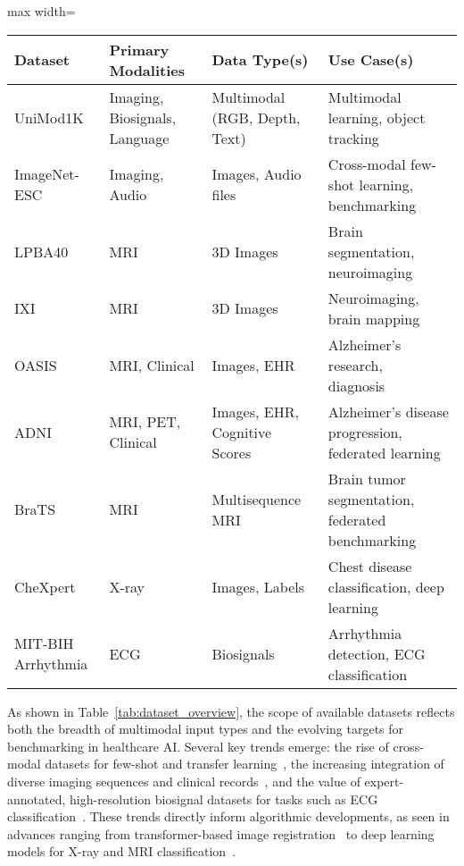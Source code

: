 \documentclass[sigconf]{acmart}
\begin{document}
\begin{table*}[htbp]
\centering
\caption{Summary of Representative Multimodal Healthcare Datasets and Supported Modalities}
\label{tab:dataset_overview}
\begin{adjustbox}{max width=\textwidth}
\begin{tabular}{@{}llll@{}}
\toprule
\textbf{Dataset} & \textbf{Primary Modalities} & \textbf{Data Type(s)} & \textbf{Use Case(s)} \\
\midrule
UniMod1K & Imaging, Biosignals, Language & Multimodal (RGB, Depth, Text) & Multimodal learning, object tracking~\cite{ref35} \\
ImageNet-ESC & Imaging, Audio & Images, Audio files & Cross-modal few-shot learning, benchmarking~\cite{ref43} \\
LPBA40 & MRI & 3D Images & Brain segmentation, neuroimaging~\cite{ref48} \\
IXI & MRI & 3D Images & Neuroimaging, brain mapping~\cite{ref48} \\
OASIS & MRI, Clinical & Images, EHR & Alzheimer’s research, diagnosis~\cite{ref48} \\
ADNI & MRI, PET, Clinical & Images, EHR, Cognitive Scores & Alzheimer’s disease progression, federated learning~\cite{ref51} \\
BraTS & MRI & Multisequence MRI & Brain tumor segmentation, federated benchmarking~\cite{ref51} \\
CheXpert & X-ray & Images, Labels & Chest disease classification, deep learning~\cite{ref54} \\
MIT-BIH Arrhythmia & ECG & Biosignals & Arrhythmia detection, ECG classification~\cite{ref101} \\
\bottomrule
\end{tabular}
\end{adjustbox}
\end{table*}

As shown in Table~\ref{tab:dataset_overview}, the scope of available datasets reflects both the breadth of multimodal input types and the evolving targets for benchmarking in healthcare AI. Several key trends emerge: the rise of cross-modal datasets for few-shot and transfer learning~\cite{ref35,ref43}, the increasing integration of diverse imaging sequences and clinical records~\cite{ref48,ref51}, and the value of expert-annotated, high-resolution biosignal datasets for tasks such as ECG classification~\cite{ref101}. These trends directly inform algorithmic developments, as seen in advances ranging from transformer-based image registration~\cite{ref48} to deep learning models for X-ray and MRI classification~\cite{ref54}.
\end{document}
